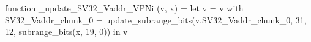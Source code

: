 function _update_SV32_Vaddr_VPNi (v, x) = let v = { v with SV32_Vaddr_chunk_0 = update_subrange_bits(v.SV32_Vaddr_chunk_0, 31, 12, subrange_bits(x, 19, 0)) } in
  v
